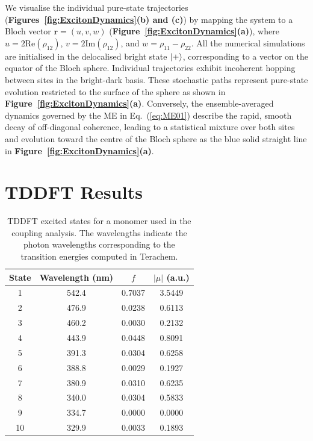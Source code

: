 \documentclass[journal=jpclcd, manuscript=letter, layout=twocolumn, doi=true]{achemso}
\begin{document}
We visualise the individual pure-state trajectories (\textbf{Figures~\ref{fig:ExcitonDynamics}(b) and (c)}) by mapping the system to a Bloch vector $\mathbf{r} = (u, v, w)$ (\textbf{Figure~\ref{fig:ExcitonDynamics}(a)}), where $u = 2\text{Re}(\rho_{12})$, $v = 2\text{Im}(\rho_{12})$, and $w = \rho_{11} - \rho_{22}$. All the numerical simulations are initialised in the delocalised bright state $\ket{+}$, corresponding to a vector on the equator of the Bloch sphere. Individual trajectories exhibit incoherent hopping between sites in the bright-dark basis. These stochastic paths represent pure-state evolution restricted to the surface of the sphere as shown in \textbf{Figure~\ref{fig:ExcitonDynamics}(a)}. Conversely, the ensemble-averaged dynamics governed by the ME in Eq.~(\ref{eq:ME01}) describe the rapid, smooth decay of off-diagonal coherence, leading to a statistical mixture over both sites and evolution toward the centre of the Bloch sphere as the blue solid straight line in \textbf{Figure~\ref{fig:ExcitonDynamics}(a)}.

\section{TDDFT Results}

\begin{table}[t]
\centering
\caption{TDDFT excited states for a monomer used in the coupling analysis. The wavelengths indicate the photon wavelengths corresponding to the transition energies computed in Terachem.}
\label{tab:roots}
\begin{tabular}{cccc}
\toprule
State & Wavelength (nm) & $f$ & $|\mu|$ (a.u.) \\
\midrule
1  & 542.4 & 0.7037 & 3.5449 \\
2  & 476.9 & 0.0238 & 0.6113 \\
3  & 460.2 & 0.0030 & 0.2132 \\
4  & 443.9 & 0.0448 & 0.8091 \\
5  & 391.3 & 0.0304 & 0.6258 \\
6  & 388.8 & 0.0029 & 0.1927 \\
7  & 380.9 & 0.0310 & 0.6235 \\
8  & 340.0 & 0.0304 & 0.5833 \\
9  & 334.7 & 0.0000 & 0.0000 \\
10 & 329.9 & 0.0033 & 0.1893 \\
\bottomrule
\end{tabular}
\end{table}
\end{document}
